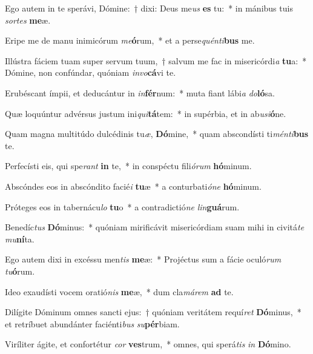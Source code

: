 \item Ego autem in te sperávi, Dómine:~† dixi: Deus me\textit{us} \textbf{es} tu:~* in mánibus tuis \textit{sor}\textit{tes} \textbf{me}æ.
\item Eripe me de manu inimicórum \textit{me}\textbf{ó}rum,~* et a perse\textit{quén}\textit{ti}\textbf{bus} me.
\item Illústra fáciem tuam super servum tuum,~† salvum me fac in misericórdi\textit{a} \textbf{tu}a:~* Dómine, non confúndar, quóniam \textit{in}\textit{vo}\textbf{cá}vi te.
\item Erubéscant ímpii, et deducántur in \textit{in}\textbf{fér}num:~* muta fiant lábi\textit{a} \textit{do}\textbf{ló}sa.
\item Quæ loquúntur advérsus justum ini\textit{qui}\textbf{tá}tem:~* in supérbia, et in ab\textit{u}\textit{si}\textbf{ó}ne.
\item Quam magna multitúdo dulcédinis tu\textit{æ}, \textbf{Dó}mine,~* quam abscondísti ti\textit{mén}\textit{ti}\textbf{bus} te.
\item Perfecísti eis, qui spe\textit{rant} \textbf{in} te,~* in conspéctu fili\textit{ó}\textit{rum} \textbf{hó}minum.
\item Abscóndes eos in abscóndito facié\textit{i} \textbf{tu}æ~* a conturbati\textit{ó}\textit{ne} \textbf{hó}minum.
\item Próteges eos in tabernácu\textit{lo} \textbf{tu}o~* a contradictió\textit{ne} \textit{lin}\textbf{guá}rum.
\item Benedíc\textit{tus} \textbf{Dó}minus:~* quóniam mirificávit misericórdiam suam mihi in civitá\textit{te} \textit{mu}\textbf{ní}ta.
\item Ego autem dixi in excéssu men\textit{tis} \textbf{me}æ:~* Projéctus sum a fácie oculó\textit{rum} \textit{tu}\textbf{ó}rum.
\item Ideo exaudísti vocem oratió\textit{nis} \textbf{me}æ,~* dum cla\textit{má}\textit{rem} \textbf{ad} te.
\item Dilígite Dóminum omnes sancti ejus:~† quóniam veritátem requí\textit{ret} \textbf{Dó}minus,~* et retríbuet abundánter faciénti\textit{bus} \textit{su}\textbf{pér}biam.
\item Viríliter ágite, et confortétur \textit{cor} \textbf{ves}trum,~* omnes, qui sperá\textit{tis} \textit{in} \textbf{Dó}mino.
